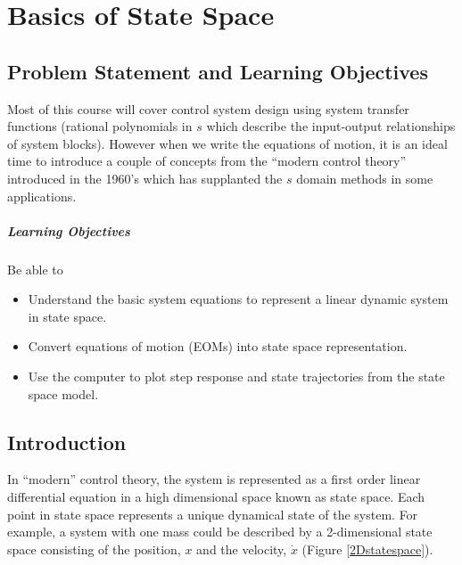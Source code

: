 

\chapter{Basics of State Space}\label{BasicsStateSpaceChapter}


\section{Problem Statement and Learning Objectives}

Most of this course will cover control system design using system transfer functions (rational polynomials in $s$ which describe the input-output relationships of system blocks).  However when we write the equations of motion, it is an ideal time to introduce a couple of concepts from the ``modern control theory'' introduced in the 1960's which has supplanted the $s$ domain methods in some applications.

\paragraph{Learning Objectives}
Be able to
\begin{itemize}
    \item Understand the basic system equations to represent a linear
    dynamic system in state space.
    \item Convert equations of motion (EOMs) into state space
    representation.
    \item Use the computer to plot step response and state trajectories from
    the state space model.
\end{itemize}

\section{Introduction}
In ``modern'' control theory, the system is represented as a first order linear differential equation in a high dimensional space known as state space.  Each point in state space represents a unique dynamical state of the system.   For example, a system with one mass could be described by a 2-dimensional state space consisting of the position, $x$ and the velocity, $\dot{x}$ (Figure \ref{2Dstatespace}).

